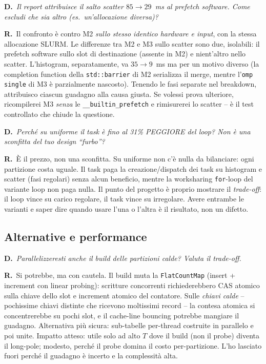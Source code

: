 \documentclass[11pt,a4paper]{article}
\newcommand{\D}[1]{\begin{dom}\small\textbf{D.}\ \itshape #1\end{dom}}
\newcommand{\R}{\noindent\textbf{R.}\ }
\begin{document}
\D{Il report attribuisce il salto scatter $85\to29$~ms al prefetch software. Come escludi che sia altro (es.\ un'allocazione diversa)?}
\R Il confronto è contro M2 \emph{sullo stesso identico hardware e input}, con la stessa allocazione SLURM. Le differenze tra M2 e M3 sullo scatter sono due, isolabili: il prefetch software sullo slot di destinazione (assente in M2) e nient'altro nello scatter. L'histogram, separatamente, va $35\to9$~ms ma per un motivo diverso (la completion function della \texttt{std::barrier} di M2 serializza il merge, mentre l'\texttt{omp single} di M3 è parzialmente nascosto). Tenendo le fasi separate nel breakdown, attribuisco ciascun guadagno alla causa giusta. Se volessi prova ulteriore, ricompilerei M3 \emph{senza} le \texttt{\_\_builtin\_prefetch} e rimisurerei lo scatter -- è il test controllato che chiude la questione.

\D{Perché su uniforme il task è fino al 31\% PEGGIORE del loop? Non è una sconfitta del tuo design ``furbo''?}
\R È il prezzo, non una sconfitta. Su uniforme non c'è nulla da bilanciare: ogni partizione costa uguale. Il task paga la creazione/dispatch dei task su histogram e scatter (fasi regolari) senza alcun beneficio, mentre la worksharing \texttt{for}-loop del variante loop non paga nulla. Il punto del progetto è proprio mostrare il \emph{trade-off}: il loop vince su carico regolare, il task vince su irregolare. Avere entrambe le varianti e saper dire quando usare l'una o l'altra è il risultato, non un difetto.

\subsection{Alternative e performance}

\D{Parallelizzeresti anche il build delle partizioni calde? Valuta il trade-off.}
\R Si potrebbe, ma con cautela. Il build muta la \texttt{FlatCountMap} (insert + increment con linear probing): scritture concorrenti richiederebbero CAS atomico sulla chiave dello slot e increment atomico del contatore. Sulle \emph{chiavi calde} -- pochissime chiavi distinte che ricevono moltissimi record -- la contesa atomica si concentrerebbe su pochi slot, e il cache-line bouncing potrebbe mangiare il guadagno. Alternativa più sicura: sub-tabelle per-thread costruite in parallelo e poi unite. Impatto atteso: utile solo ad alto $T$ dove il build (non il probe) diventa il long-pole; modesto, perché il probe domina il costo per-partizione. L'ho lasciato fuori perché il guadagno è incerto e la complessità alta.
\end{document}
